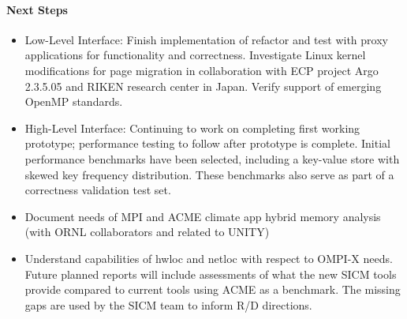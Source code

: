 \paragraph{Next Steps}
\begin{itemize}
	\item  Low-Level Interface: Finish implementation of refactor and test with proxy applications for functionality and correctness. Investigate Linux kernel modifications for page migration in collaboration with ECP project Argo 2.3.5.05 and RIKEN research center in Japan. Verify support of emerging OpenMP standards.
\item High-Level Interface: Continuing to work on completing first working prototype; performance testing to follow after prototype is complete.   Initial performance benchmarks have been selected, including a key-value store with skewed key frequency distribution.   These benchmarks also serve as part of a correctness validation test set.
\item Document needs of MPI and ACME climate app hybrid memory analysis (with ORNL collaborators and related to UNITY)
\item Understand capabilities of hwloc and netloc with respect to OMPI-X needs.
Future planned reports will include assessments of what the new SICM tools provide compared to current tools using ACME as a benchmark. The missing gaps are used by the SICM team to inform R/D directions.	
\end{itemize}


